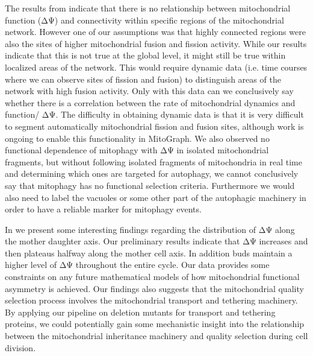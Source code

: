 The results from  indicate that there is no relationship between mitochondrial function (ΔΨ) and connectivity within specific regions of the mitochondrial network. However one of our assumptions was that highly connected regions were also the sites of higher mitochondrial fusion and fission activity. While our results indicate that this is not true at the global level, it might still be true within localized areas of the network. This would require dynamic data (i.e. time courses where we can observe sites of fission and fusion) to distinguish areas of the network with high fusion activity. Only with this data can we conclusively say whether there is a correlation between the rate of mitochondrial dynamics and function/ ΔΨ. The difficulty in obtaining dynamic data is that it is very difficult to segment automatically mitochondrial fission and fusion sites, although work is ongoing to enable this functionality in MitoGraph. We also observed no functional dependence of mitophagy with ΔΨ in isolated mitochondrial fragments, but without following isolated fragments of mitochondria in real time and determining which ones are targeted for autophagy, we cannot conclusively say that mitophagy has no functional selection criteria. Furthermore we would also need to label the vacuoles or some other part of the autophagic machinery in order to have a reliable marker for mitophagy events.
 
In   we present some interesting findings regarding the distribution of ΔΨ along the mother daughter axis. Our preliminary results indicate that ΔΨ increases and then plateaus halfway along the mother cell axis. In addition buds maintain a higher level of ΔΨ throughout the entire cycle. Our data provides some constraints on any future mathematical models of how mitochondrial functional asymmetry is achieved. Our findings also suggests that the mitochondrial quality selection process involves the mitochondrial transport and tethering machinery. By applying our pipeline on deletion mutants for transport and tethering proteins, we could potentially gain some mechanistic insight into the relationship between the mitochondrial inheritance machinery and quality selection during cell division.



























